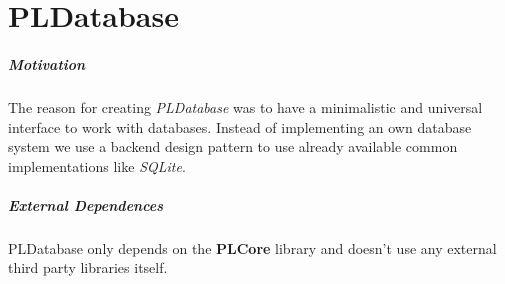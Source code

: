 \chapter{PLDatabase}


\paragraph{Motivation}
The reason for creating \emph{PLDatabase} was to have a minimalistic and universal interface to work with databases. Instead of implementing an own database system we use a backend design pattern to use already available common implementations like \emph{SQLite}.


\paragraph{External Dependences}
PLDatabase only depends on the \textbf{PLCore} library and doesn't use any external third party libraries itself.





\cleardoublepage

\cleardoublepage

